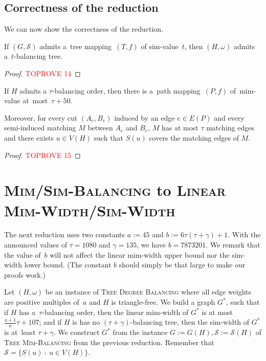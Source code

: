 \documentclass[a4paper,UKenglish,cleveref,hyperref,autoref]{lipics-v2021}
\newcommand{\weight}{\omega}
\newcommand{\tdb}{\textsc{Tree Degree Balancing}\xspace}
\newcommand{\tmb}{\textsc{Tree Mim-Balancing}\xspace}
\newcommand{\tmap}{tree mapping\xspace}
\newcommand{\pmap}{path mapping\xspace}
\begin{document}
\subsection{Correctness of the reduction}

We can now show the correctness of the reduction.

\begin{lemma}\label{lem:simwidth2balanced}
If $(G, \mathcal S)$ admits a~\tmap~$(T, f)$ of sim-value~$t$, then $(H,\weight)$ admits a~$t$-balancing tree.
\end{lemma}
\begin{proof}\textcolor{red}{TOPROVE 14}\end{proof}

\begin{lemma}\label{lem:balanced2sim-width}
If $H$ admits a $\tau$-balancing order, then there is a~\pmap~$(P, f)$ of~mim-value at~most~$\tau + 50$.

Moreover, for every cut $(A_e, B_e)$ induced by an edge $e\in E(P)$ and every semi-induced matching $M$ between $A_e$ and $B_e$, $M$ has at most $\tau$ matching edges and there exists $u\in V(H)$ such that $S(u)$ covers the matching edges of $M$.
\end{lemma}

\begin{proof}\textcolor{red}{TOPROVE 15}\end{proof}

\section{\textsc{Mim/Sim-Balancing} to \textsc{Linear Mim-Width/Sim-Width}}\label{sec:balancing-to-mim-width}

\newcommand{\gad}{\mathcal G}

The next reduction uses two constants $a := 45$ and $b:= 6 \tau (\tau + \gamma) + 1$.
With the announced values of $\tau = 1080$ and $\gamma = 135$, we have $b = 7873201$.
We remark that the value of~$b$ will not affect the linear mim-width upper bound nor the sim-width lower bound.
(The constant $b$ should simply be that large to make our proofs work.)

Let $(H, \weight)$ be an instance of \tdb where all edge weights are positive multiples of~$a$ and $H$ is triangle-free.
We build a graph $G^*$, such that if $H$ has a~$\tau$-balancing order, then the linear mim-width of $G^*$ is at most $\frac{a+1}{a} \tau + 107$; and if $H$ is has no $(\tau+\gamma)$-balancing tree, then the sim-width of $G^*$ is at~least $\tau+\gamma$.
We construct $G^*$ from the instance $G := G(H), \mathcal S := \mathcal{S}(H)$ of \tmb from the previous reduction.
Remember that $\mathcal S = \{S(u)~:~u \in V(H)\}$.
\end{document}

